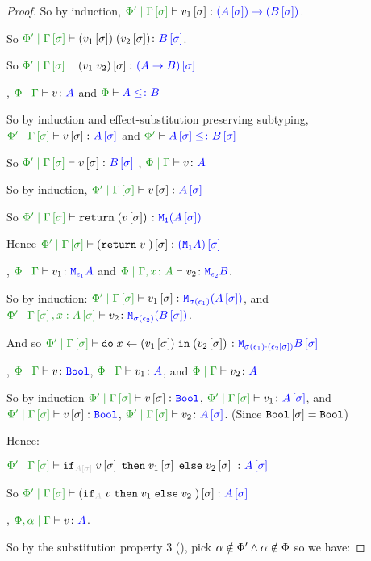\documentclass{report}
\begin{document}
\begin{framed}
\begin{proof}
    So by induction, $\etyperelation{\P'}{\G\ssi}{v_1\ssi}{\fntype{(A\ssi)}{(B\ssi)}}$.
    
    So $\etyperelation{\P'}{\G\ssi}{\apply{(v_1\ssi)}{(v_2\ssi)}}{B\ssi}$.
    
    So $\etyperelation{\P'}{\G\ssi}{(\apply{v_1}{v_2})\ssi}{(\ab)\ssi}$
    
    \bi, $\gpetyperelation{v}{A}$ and $\wellformed{\P}{A\subtype B}$
    
    So by induction and effect-substitution preserving subtyping, $\etyperelation{\P'}{\G\ssi}{v\ssi}{A\ssi}$ and $\wellformed{\P'}{A\ssi\subtype B\ssi}$
    
    So $\etyperelation{\P'}{\G\ssi}{v\ssi}{B\ssi}$
    \bi, $\gpetyperelation{v}{A}$
    
    So by induction, $\etyperelation{\P'}{\G\ssi}{v\ssi}{A\ssi}$
    
    So $\etyperelation{\P'}{\G\ssi}{\return{(v\ssi)}}{\M{\1}{(A\ssi)}}$
    
    Hence $\etyperelation{\P'}{\G\ssi}{(\return{v})\ssi}{(\moa)\ssi}$
    
    \bi, $\gpetyperelation{v_1}{\M{\e_1}{A}}$ and $\etyperelation{\P}{\gax}{v_2}{\M{\e_2}{B}}$.
    
    So by induction: $\etyperelation{\P'}{\G\ssi}{v_1\ssi}{\M{\si(\e_1)}{(A\ssi)}}$, and $\etyperelation{\P'}{\G\ssi, x:A\ssi}{v_2}{\M{\si(\e_2)}{(B\ssi)}}$.
    
    And so $\etyperelation{\P'}{\G\ssi}{\doin{x}{(v_1\ssi)}{(v_2\ssi)}}{\M{\si(\e_1)\dot(\e_2\ssi)}{B\ssi}}$
    
    
    
    \bi, $\gpetyperelation{v}{\B}$, $\gpetyperelation{v_1}{A}$, and $\gpetyperelation{v_2}{A}$
    
    So by induction $\etyperelation{\P'}{\G\ssi}{v\ssi}{\B}$, $\etyperelation{\P'}{\G\ssi}{v_1}{A\ssi}$, and $\etyperelation{\P'}{\G\ssi}{v\ssi}{\B}$, $\etyperelation{\P'}{\G\ssi}{v_2}{A\ssi}$.
    (Since $\texttt{Bool}\left[\sigma\right] = \texttt{Bool}$)
    
    Hence:
    
    $\etyperelation{\P'}{\G\ssi}{\pifthenelse{A\ssi}{v\ssi}{v_1\ssi}{v_2\ssi}}{A\ssi}$
    
    So $\etyperelation{\P'}{\G\ssi}{(\pifthenelse{A}{v}{v_1}{v_2})\ssi}{A\ssi}$
    
    \bi, $\etyperelation{\P,\a}{\G}{v}{A}$.
    
    So by the substitution property 3 (), pick $\alpha\notin\Phi'\wedge\alpha\notin\Phi$ so we have:
    

\end{proof}
\end{framed}
\end{document}
